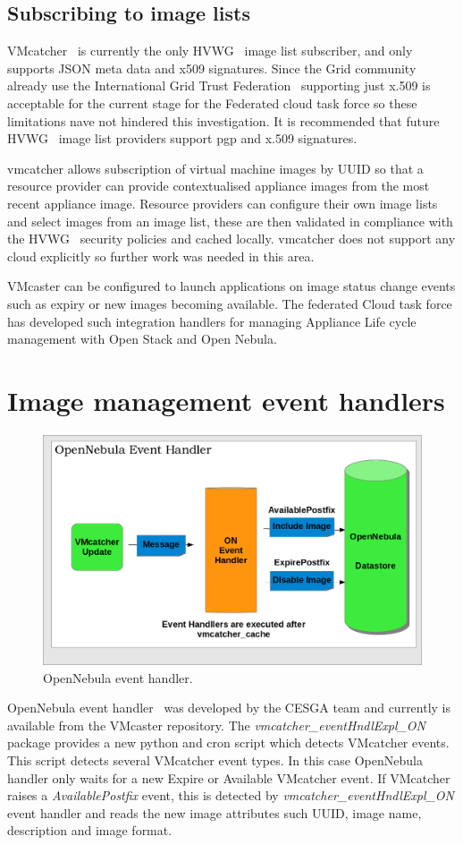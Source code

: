 \documentclass{llncs_Ibergrid2013}
\begin{document}
\subsection{Subscribing to image lists}
VMcatcher~\cite{vmcatcher} is currently the only HVWG~\cite{hepix} image list subscriber, and only supports JSON meta data and x509 signatures. Since the Grid community already use the International Grid Trust Federation~\cite{igtf} supporting just x.509 is acceptable for the current stage for the Federated cloud task force so these limitations nave not hindered this investigation. It is recommended that future HVWG~\cite{hepix} image list providers support pgp and x.509 signatures.

vmcatcher allows subscription of virtual machine images by UUID so that a resource provider can provide contextualised appliance images from the most recent appliance image. Resource providers can configure their own image lists and select images from an image list, these are then validated in compliance with the HVWG~\cite{hepix} security policies and cached locally. vmcatcher does not support any cloud explicitly so further work was needed in this area.

VMcaster can be configured to launch applications on image status change events such as expiry or new images becoming available. The federated Cloud task force has developed such integration handlers for managing Appliance Life cycle management with Open Stack and Open Nebula.
\section{Image management event handlers}
\label{sect-handlers}
\begin{figure}[h]
\centering
\includegraphics[width=1\textwidth]{ONeventhandler.png}
\caption{OpenNebula event handler.}
\label{fig:onevent}
\end{figure}
OpenNebula event handler~\cite{onevent} was developed by the CESGA team and currently is available from the VMcaster repository. 
The \textit{vmcatcher\_eventHndlExpl\_ON} package provides a new python and cron script which detects VMcatcher events. 
This script detects several VMcatcher event types. In this case OpenNebula handler only waits for a new Expire or Available VMcatcher event.
If VMcatcher raises a \textit{AvailablePostfix} event, this is detected by \textit{vmcatcher\_eventHndlExpl\_ON} event handler and reads the new image attributes such UUID, image name, description and image format.
\end{document}
